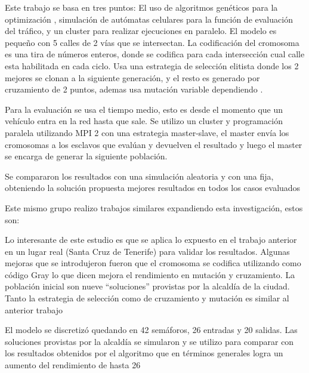 \begin{itemize}
	\begin{item}
		
		Este trabajo se basa en tres puntos: El uso de algoritmos genéticos para la optimización , simulación de autómatas celulares para la función de evaluación del tráfico, y un cluster para realizar ejecuciones en paralelo.
		El modelo es pequeño con 5 calles de 2 vías que se intersectan.
		La codificación del cromosoma es una tira de números enteros, donde se codifica para cada intersección cual calle esta habilitada en cada ciclo.
		Usa una estrategia de selección elitista donde los 2 mejores se clonan a la siguiente generación, y el resto es generado por cruzamiento de 2 puntos, ademas usa mutación variable dependiendo .
		
		Para la evaluación se usa el tiempo medio, esto es desde el momento que un vehículo entra en la red hasta que sale. Se utilizo un cluster y programación paralela utilizando MPI 2 con una estrategia master-slave, el master envía los cromosomas a los esclavos que evalúan y devuelven el resultado y luego el master se encarga de generar la siguiente población.
		
		Se compararon los resultados con una simulación aleatoria y con una fija, obteniendo la solución propuesta mejores resultados en todos los casos evaluados
		
		Este mismo grupo realizo trabajos similares expandiendo esta investigación, estos son:
	\end{item}

	\begin{item}
		\bibentry{Sanchez2008}
Lo interesante de este estudio es que se aplica lo expuesto en el trabajo anterior en un lugar real (Santa Cruz de Tenerife) para validar los resultados.
Algunas mejoras que se introdujeron fueron que el cromosoma se codifica utilizando como código Gray lo que dicen mejora el rendimiento en mutación y cruzamiento. La población inicial son nueve “soluciones” provistas por la alcaldía de la ciudad. Tanto la estrategia de selección como de cruzamiento y mutación  es similar al anterior trabajo

El modelo se discretizó quedando en 42 semáforos, 26 entradas y 20 salidas.
Las soluciones provistas por la alcaldía se simularon y se utilizo para comparar con los resultados obtenidos por el algoritmo que en términos generales logra un aumento del rendimiento de hasta 26%

	\end{item}


\end{itemize}
